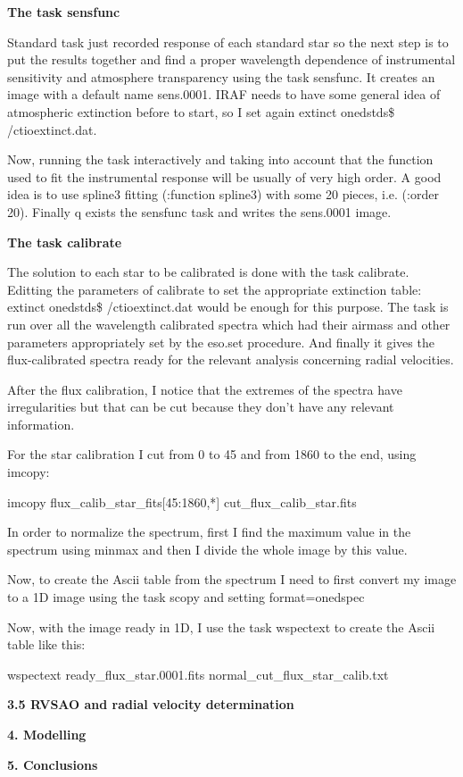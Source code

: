 \documentclass[english]{article}
\begin{document}
\textbf{The task sensfunc}

Standard task just recorded response of each standard star so the next step is to put the results together and find a proper wavelength dependence of instrumental sensitivity and atmosphere transparency using the task sensfunc. It creates an image with a default name sens.0001. IRAF needs to have some general idea of atmospheric extinction before to start, so I set again extinct onedstds\$ /ctioextinct.dat.

Now, running the task interactively and taking into account that the function used to fit the instrumental response will be usually of very high order. A good idea is to use spline3 fitting (:function spline3) with some 20 pieces, i.e. (:order 20).
Finally q exists the sensfunc task and writes the sens.0001 image.

\textbf{The task calibrate}

The solution to each star to be calibrated is done with the task calibrate. Editting the parameters of calibrate to set the appropriate extinction table: extinct onedstds\$ /ctioextinct.dat would be enough for this purpose. The task is run over all the wavelength calibrated spectra which had their airmass and other parameters appropriately set by the eso.set procedure. And finally it gives the flux-calibrated spectra ready for the relevant analysis concerning radial velocities.

After the flux calibration, I notice that the extremes of the spectra have irregularities but that can be cut because they don't have any relevant information.

For the star calibration I cut from 0 to 45 and from 1860 to the end, using imcopy:

\begin{center}
imcopy flux\_calib\_star\_fits[45:1860,*] cut\_flux\_calib\_star.fits
\end{center}

In order to normalize the spectrum, first I find the maximum value in the spectrum using minmax and then I divide the whole image by this value.

Now, to create the Ascii table from the spectrum I need to first convert my image to a 1D image using the task scopy and setting format=onedspec

Now, with the image ready in 1D, I use the task wspectext to create the Ascii table like this:

\begin{center}
wspectext ready\_flux\_star.0001.fits normal\_cut\_flux\_star\_calib.txt
\end{center}

\textbf{{\Large 3.5 RVSAO and radial velocity determination}}



\textbf{{\LARGE 4. Modelling}}



\textbf{{\LARGE 5. Conclusions}}
\end{document}
